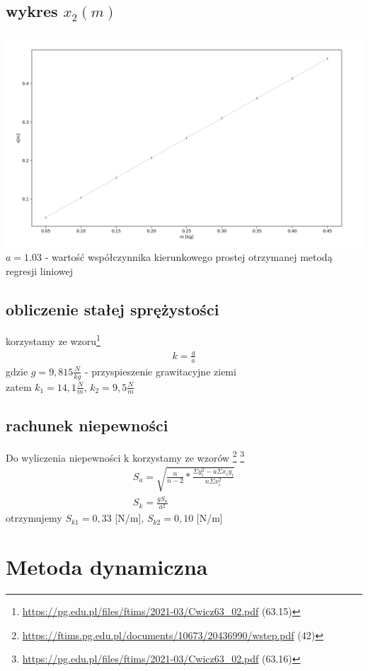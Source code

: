 \documentclass{article}
\begin{document}
\subsection{wykres $x_2(m)$}
\includegraphics[width=15cm]{m7_1_2}
$a = 1.03$ - wartość współczynnika kierunkowego prostej otrzymanej metodą regresji liniowej
\subsection{obliczenie stałej sprężystości}
korzystamy ze wzoru\footnote{\url{https://pg.edu.pl/files/ftims/2021-03/Cwicz63_02.pdf} (63.15)}
\begin{gather*}
	k = \frac{g}{a}
\end{gather*} 
gdzie $g = 9,815  \frac{N}{kg}$ - przyspieszenie grawitacyjne ziemi\\
zatem $k_1=14,1 \frac{N}{m}$, $k_2 = 9,5 \frac{N}{m}$

\subsection{rachunek niepewności}

Do wyliczenia niepewności k korzystamy ze wzorów \footnote{\url{https://ftims.pg.edu.pl/documents/10673/20436990/wstep.pdf} (42)} \footnote{\url{https://pg.edu.pl/files/ftims/2021-03/Cwicz63_02.pdf} (63.16)}
\begin{gather*}
S_a = \sqrt{\frac{n}{n-2} * \frac{\Sigma y_i^2 - a\Sigma x_iy_i}{n\Sigma x_i^2}} \\
S_k = \frac{gS_a}{a^2}
\end{gather*}
otrzymujemy $S_{k1} = 0,33$ [N/m],  $S_{k2} = 0,10$ [N/m]

\section{Metoda dynamiczna}
\end{document}
